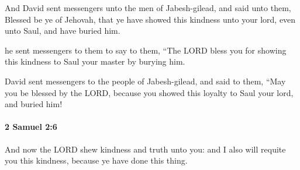 			\begin{versebox}
					\item[BHS] 
					\item[ASV] And David sent messengers unto the men of Jabesh-gilead, and said unto them, Blessed be ye of Jehovah, that ye have showed this kindness unto your lord, even unto Saul, and have buried him.
					\item[NIV] he sent messengers to them to say to them, “The LORD bless you for showing this kindness to Saul your master by burying him.
					\item[NRSV] David sent messengers to the people of Jabesh-gilead, and said to them, “May you be blessed by the LORD, because you showed this loyalty to Saul your lord, and buried him!
			\end{versebox}

		\paragraph{2 Samuel 2:6} %
			\label{2SAMUEL-2-6}

			And now the LORD shew kindness and truth unto you: and I also will requite you this kindness, because ye have done this thing.

